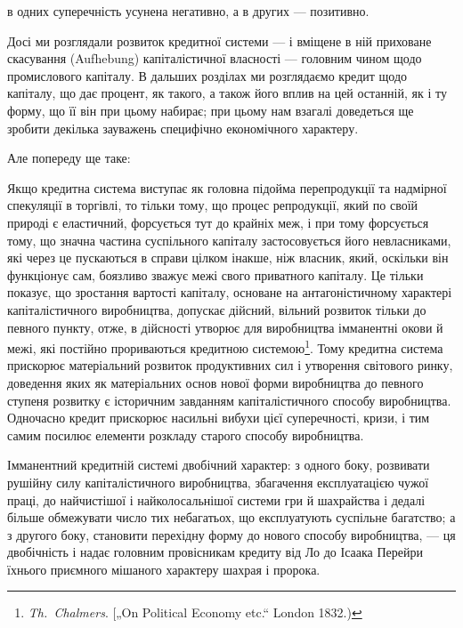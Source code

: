 \parcont{}  %
в одних суперечність усунена негативно, а в других — позитивно.

Досі ми розглядали розвиток кредитної системи — і вміщене
в ній приховане скасування (Aufhebung) капіталістичної власності — головним чином щодо промислового
капіталу. В дальших розділах ми розглядаємо кредит щодо капіталу, що дає процент, як
такого, а також його вплив на цей останній, як і ту форму, що
її він при цьому набирає; при цьому нам взагалі доведеться ще
зробити декілька зауважень специфічно економічного характеру.

Але попереду ще таке:

Якщо кредитна система виступає як головна підойма перепродукції та надмірної спекуляції в торгівлі,
то тільки тому,
що процес репродукції, який по своїй природі є еластичний,
форсується тут до крайніх меж, і при тому форсується тому,
що значна частина суспільного капіталу застосовується його
невласниками, які через це пускаються в справи цілком інакше,
ніж власник, який, оскільки він функціонує сам, боязливо зважує
межі свого приватного капіталу. Це тільки показує, що зростання вартості капіталу, основане на
антагоністичному характері
капіталістичного виробництва, допускає дійсний, вільний розвиток тільки до певного пункту, отже, в
дійсності утворює для виробництва імманентні окови й межі, які постійно прориваються
кредитною системою\footnote{
\emph{Th.~Chalmers}. [„On Political Economy etc.“ London 1832.)
}. Тому кредитна система прискорює матеріальний розвиток продуктивних сил і
утворення світового ринку,
доведення яких як матеріальних основ нової форми виробництва
до певного ступеня розвитку є історичним завданням капіталістичного способу виробництва. Одночасно
кредит прискорює насильні вибухи цієї суперечності, кризи, і тим самим посилює елементи розкладу
старого способу виробництва.

Імманентний кредитній системі двобічний характер: з одного
боку, розвивати рушійну силу капіталістичного виробництва,
збагачення експлуатацією чужої праці, до найчистішої і найколосальнішої системи гри й шахрайства і
дедалі більше обмежувати число тих небагатьох, що експлуатують суспільне багатство; а з другого
боку, становити перехідну форму до нового
способу виробництва, — ця двобічність і надає головним провісникам кредиту від Ло до Ісаака Перейри
їхнього приємного мішаного характеру шахрая і пророка.
